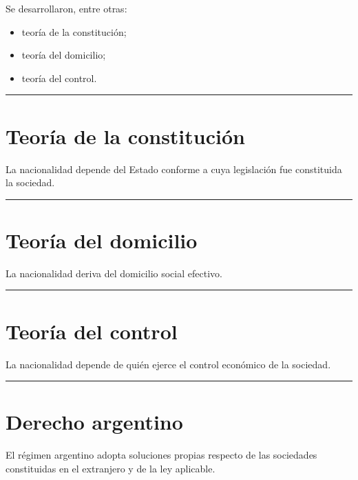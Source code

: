 \documentclass[
  spanish,
  letterpaper,
  DIV=11,
  numbers=noendperiod]{scrartcl}
\providecommand{\tightlist}{%
  \setlength{\itemsep}{0pt}\setlength{\parskip}{0pt}}
\begin{document}
Se desarrollaron, entre otras:

\begin{itemize}
\tightlist
\item
  teoría de la constitución;
\item
  teoría del domicilio;
\item
  teoría del control.
\end{itemize}

\begin{center}\rule{0.5\linewidth}{0.5pt}\end{center}

\section{Teoría de la
constitución}\label{teoruxeda-de-la-constituciuxf3n}

La nacionalidad depende del Estado conforme a cuya legislación fue
constituida la sociedad.

\begin{center}\rule{0.5\linewidth}{0.5pt}\end{center}

\section{Teoría del domicilio}\label{teoruxeda-del-domicilio}

La nacionalidad deriva del domicilio social efectivo.

\begin{center}\rule{0.5\linewidth}{0.5pt}\end{center}

\section{Teoría del control}\label{teoruxeda-del-control}

La nacionalidad depende de quién ejerce el control económico de la
sociedad.

\begin{center}\rule{0.5\linewidth}{0.5pt}\end{center}

\section{Derecho argentino}\label{derecho-argentino}

El régimen argentino adopta soluciones propias respecto de las
sociedades constituidas en el extranjero y de la ley aplicable.
\end{document}
